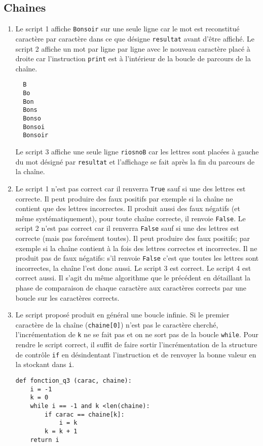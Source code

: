 \subsection{Chaines}
\begin{enumerate}
  \item Le script 1 affiche \verb|Bonsoir| sur une seule ligne car le mot est reconstitué caractère par caractère dans ce que désigne \verb|resultat| avant d'être affiché.\newline
  Le script 2 affiche un mot par ligne par ligne avec le nouveau caractère placé à droite car l'instruction \verb|print| est à l'intérieur de la boucle de parcours de la chaîne.
\begin{verbatim}
  B
  Bo
  Bon
  Bons
  Bonso
  Bonsoi
  Bonsoir
\end{verbatim}
Le script 3 affiche une seule ligne \verb|riosnoB| car les lettres sont placées à gauche du mot désigné par \verb|resultat| et l'affichage se fait après la fin du parcours de la chaîne.

  \item Le script 1 n'est pas correct car il renverra \verb|True| sauf si une des lettres est correcte. Il peut produire des faux positifs par exemple si la chaîne ne contient que des lettres incorrectes. Il produit aussi des faux négatifs (et même systématiquement), pour toute chaîne correcte, il renvoie \verb|False|.\newline
  Le script 2 n'est pas correct car il renverra \verb|False| sauf si une des lettres est correcte (mais pas forcément toutes). Il peut produire des faux positifs; par exemple si la chaîne contient à la fois des lettres correctes et incorrectes. Il ne produit pas de faux négatifs: s'il renvoie \verb|False| c'est que toutes les lettres sont incorrectes, la chaîne l'est donc aussi.\newline
  Le script 3 est correct.\newline
  Le script 4 est correct aussi. Il s'agit du même algorithme que le précédent en détaillant la phase de comparaison de chaque caractère aux caractères corrects par une boucle sur les caractères corrects.
  \item Le script proposé produit en général une boucle infinie. Si le premier caractère de la chaîne (\verb|chaine[0]|) n'est pas le caractère cherché, l'incrémentation de \verb|k| ne se fait pas et on ne sort pas de la boucle \verb|while|.\newline
  Pour rendre le script correct, il suffit de faire sortir l'incrémentation de la structure de contrôle \verb|if| en désindentant l'instruction et de renvoyer la bonne valeur en la stockant dans \verb|i|.
\begin{verbatim}
def fonction_q3 (carac, chaine):
    i = -1
    k = 0
    while i == -1 and k <len(chaine):
        if carac == chaine[k]:
            i = k
        k = k + 1
    return i
\end{verbatim}
\end{enumerate}

